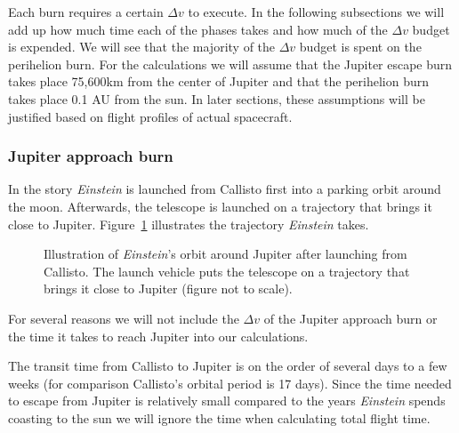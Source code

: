 \documentclass[12pt]{article} %
\begin{document}
Each burn requires a certain $\Delta v$ to execute. In the following subsections we will add up how much time each of the phases takes and how much of the $\Delta v$ budget is expended. We will see that the majority of the $\Delta v$ budget is spent on the perihelion burn. For the calculations we will assume that the Jupiter escape burn takes place 75,600km from the center of Jupiter and that the perihelion burn takes place 0.1 AU from the sun. In later sections, these assumptions will be justified based on flight profiles of actual spacecraft.

\subsubsection{Jupiter approach burn}
In the story \textit{Einstein} is launched from Callisto first into a parking orbit around the moon. Afterwards, the telescope is launched on a trajectory that brings it close to Jupiter. Figure~\ref{fig:jupiterapproach} illustrates the trajectory \textit{Einstein} takes.

\begin{figure}[H]
	\caption{Illustration of \textit{Einstein}'s orbit around Jupiter after launching from Callisto. The launch vehicle puts the telescope on a trajectory that brings it close to Jupiter (figure not to scale).}
	\label{fig:jupiterapproach}
\end{figure}

For several reasons we will not include the $\Delta v$ of the Jupiter approach burn or the time it takes to reach Jupiter into our calculations.

The transit time from Callisto to Jupiter is on the order of several days to a few weeks (for comparison Callisto's orbital period is 17 days). Since the time needed to escape from Jupiter is relatively small compared to the years \textit{Einstein} spends coasting to the sun we will ignore the time when calculating total flight time.
\end{document}
